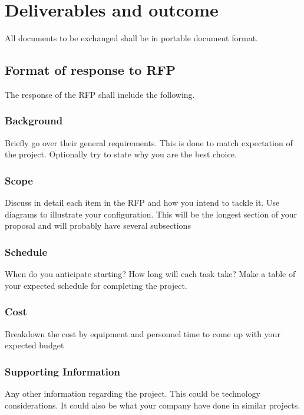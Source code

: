 \section{Deliverables and outcome}
All documents to be exchanged shall be in portable document format. 

\subsection{Format of response to RFP}
The response of the RFP shall include the following.

\subsubsection{Background}
Briefly go over their general requirements. This is done to match expectation of the project. Optionally try to state why you are the best choice. 

\subsubsection{Scope}
Discuss in detail each item in the RFP and how you intend to tackle it. Use diagrams to illustrate your
configuration. This will be the longest section of your proposal and will probably have several
subsections

\subsubsection{Schedule}
When do you anticipate starting? How long will each task take? Make a table of your expected schedule for completing the project.

\subsubsection{Cost}
Breakdown the cost by equipment and personnel time to come up with your expected budget

\subsubsection{Supporting Information}
Any other information regarding the project. This could be technology considerations. It could also be what your company have done in similar projects. 